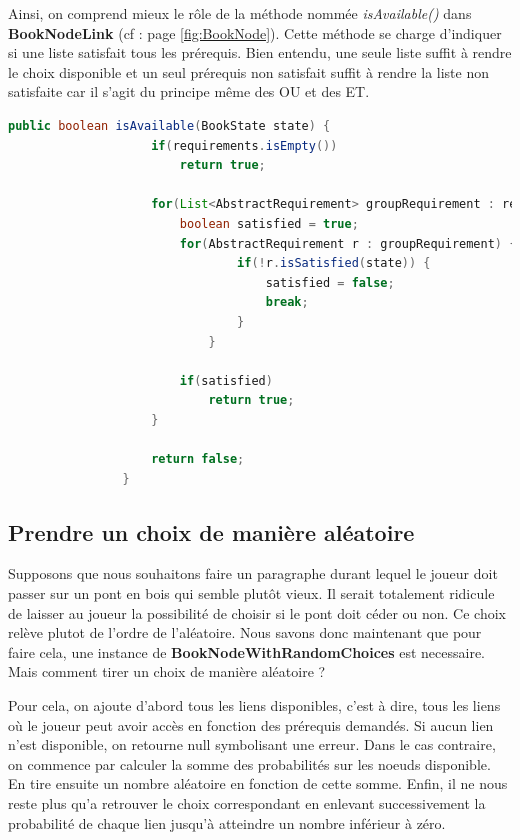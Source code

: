 			Ainsi, on comprend mieux le rôle de la méthode nommée \textit{isAvailable()} dans \textbf{BookNodeLink} (cf :  page \ref{fig:BookNode}). Cette méthode se charge d'indiquer si une liste satisfait tous les prérequis. Bien entendu, une seule liste suffit à rendre le choix disponible et un seul prérequis non satisfait suffit à rendre la liste non satisfaite car il s'agit du principe même des OU et des ET.

			\begin{lstlisting}[gobble=16, language=java, caption=exemple de isAvailable()]
				public boolean isAvailable(BookState state) {
					if(requirements.isEmpty())
						return true;

					for(List<AbstractRequirement> groupRequirement : requirements) {
						boolean satisfied = true;
						for(AbstractRequirement r : groupRequirement) {
								if(!r.isSatisfied(state)) {
									satisfied = false;
									break;
								}
							}

						if(satisfied)
							return true;
					}

					return false;
				}
			\end{lstlisting}

		\subsection{Prendre un choix de manière aléatoire}

			Supposons que nous souhaitons faire un paragraphe durant lequel le joueur doit passer sur un pont en bois qui semble plutôt vieux. Il serait totalement ridicule de laisser au joueur la possibilité de choisir si le pont doit céder ou non. Ce choix relève plutot de l'ordre de l'aléatoire. Nous savons donc maintenant que pour faire cela, une instance de \textbf{BookNodeWithRandomChoices} est necessaire. Mais comment tirer un choix de manière aléatoire ?

			Pour cela, on ajoute d'abord tous les liens disponibles, c'est à dire, tous les liens où le joueur peut avoir accès en fonction des prérequis demandés. Si aucun lien n'est disponible, on retourne null symbolisant une erreur. Dans le cas contraire, on commence par calculer la somme des probabilités sur les noeuds disponible. En tire ensuite un nombre aléatoire en fonction de cette somme. Enfin, il ne nous reste plus qu'a retrouver le choix correspondant en enlevant successivement la probabilité de chaque lien jusqu'à atteindre un nombre inférieur à zéro.

